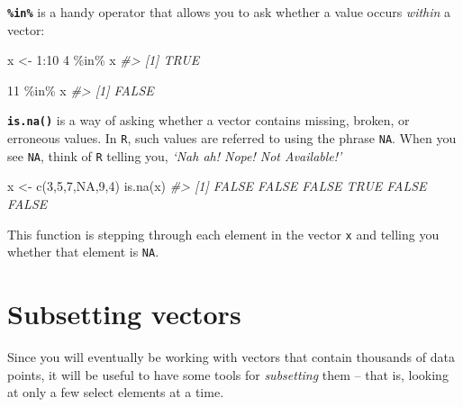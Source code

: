 \documentclass[
]{book}
\newenvironment{Shaded}{\begin{snugshade}}{\end{snugshade}}
\newcommand{\CommentTok}[1]{\textcolor[rgb]{0.56,0.35,0.01}{\textit{#1}}}
\newcommand{\ConstantTok}[1]{\textcolor[rgb]{0.00,0.00,0.00}{#1}}
\newcommand{\DecValTok}[1]{\textcolor[rgb]{0.00,0.00,0.81}{#1}}
\newcommand{\FunctionTok}[1]{\textcolor[rgb]{0.00,0.00,0.00}{#1}}
\newcommand{\NormalTok}[1]{#1}
\newcommand{\OtherTok}[1]{\textcolor[rgb]{0.56,0.35,0.01}{#1}}
\newcommand{\SpecialCharTok}[1]{\textcolor[rgb]{0.00,0.00,0.00}{#1}}
\begin{document}
\textbf{\texttt{\%in\%}} is a handy operator that allows you to ask whether a value occurs \emph{within} a vector:

\begin{Shaded}
\begin{Highlighting}[]
\NormalTok{x }\OtherTok{\textless{}{-}} \DecValTok{1}\SpecialCharTok{:}\DecValTok{10}
\DecValTok{4} \SpecialCharTok{\%in\%}\NormalTok{ x}
\CommentTok{\#\textgreater{} [1] TRUE}
\end{Highlighting}
\end{Shaded}

\begin{Shaded}
\begin{Highlighting}[]
\DecValTok{11} \SpecialCharTok{\%in\%}\NormalTok{ x}
\CommentTok{\#\textgreater{} [1] FALSE}
\end{Highlighting}
\end{Shaded}

\textbf{\texttt{is.na()}} is a way of asking whether a vector contains missing, broken, or erroneous values. In \texttt{R}, such values are referred to using the phrase \texttt{NA}. When you see \texttt{NA}, think of \texttt{R} telling you, \emph{`Nah ah! Nope! Not Available!'}

\begin{Shaded}
\begin{Highlighting}[]
\NormalTok{x }\OtherTok{\textless{}{-}} \FunctionTok{c}\NormalTok{(}\DecValTok{3}\NormalTok{,}\DecValTok{5}\NormalTok{,}\DecValTok{7}\NormalTok{,}\ConstantTok{NA}\NormalTok{,}\DecValTok{9}\NormalTok{,}\DecValTok{4}\NormalTok{)}
\FunctionTok{is.na}\NormalTok{(x)}
\CommentTok{\#\textgreater{} [1] FALSE FALSE FALSE  TRUE FALSE FALSE}
\end{Highlighting}
\end{Shaded}

This function is stepping through each element in the vector \texttt{x} and telling you whether that element is \texttt{NA}.

\hypertarget{subsetting-vectors}{%
\section*{Subsetting vectors}\label{subsetting-vectors}}

Since you will eventually be working with vectors that contain thousands of data points, it will be useful to have some tools for \emph{subsetting} them -- that is, looking at only a few select elements at a time.
\end{document}
